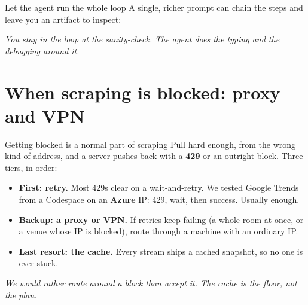 \documentclass[aspectratio=169,11pt]{beamer}
\begin{document}
\begin{frame}{Let the agent run the whole loop}
  A single, richer prompt can chain the steps and leave you an artifact to inspect:
  \begin{center}
  \end{center}
  \vspace{0.4em}
  \begin{center}
    \itshape You stay in the loop at the sanity-check. The agent does the typing and the
    debugging around it.
  \end{center}
\end{frame}

\section{When scraping is blocked: proxy and VPN}

\begin{frame}{Getting blocked is a normal part of scraping}
  Pull hard enough, from the wrong kind of address, and a server pushes back with a
  \textbf{429} or an outright block. Three tiers, in order:
  \begin{itemize}
    \item \textbf{First: retry.} Most 429s clear on a wait-and-retry. We tested Google Trends
          from a Codespace on an \textbf{Azure} IP: 429, wait, then success. Usually enough.
    \item \textbf{Backup: a proxy or VPN.} If retries keep failing (a whole room at once, or a
          venue whose IP is blocked), route through a machine with an ordinary IP.
    \item \textbf{Last resort: the cache.} Every stream ships a cached snapshot, so no one is
          ever stuck.
  \end{itemize}
  \vspace{0.2em}
  \begin{center}
    \itshape We would rather route around a block than accept it. The cache is the floor, not
    the plan.
  \end{center}
\end{frame}
\end{document}
